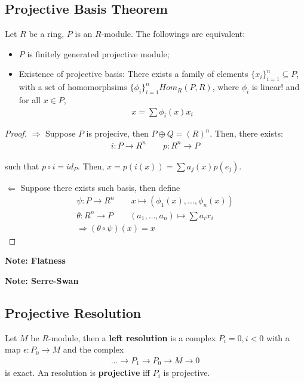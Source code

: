 \documentclass[Total.tex]{subfiles}
\begin{document}
			\subsection{Projective Basis Theorem}
				\begin{theorem}
					Let $R$ be a ring, $P$ is an $R$-module. The followings are equivalent:
					\begin{itemize}
						\item $P$ is finitely generated projective module;
						\item Existence of projective basis: There exists a family of elements $\{x_i\}_{i=1}^n\subseteq P$, with a set of homomorphsims $\{\phi_i\}_{i=1}^n Hom_R(P,R)$, where $\phi_i$ is linear! and for all $x\in P$,
						\begin{gather*}
							x=\sum \phi_i(x)x_i
						\end{gather*}
					\end{itemize}
				\end{theorem}
				\begin{proof}
					$\Rightarrow$ Suppose $P$ is projecive, then $P\oplus Q=(R)^n$. Then, there exists:
					\begin{gather*}
						i:P\rightarrow R^n\qquad p:R^n\rightarrow P
					\end{gather*}
					
					such that $p\circ i=id_P$. Then, $x=p(i(x))=\sum a_j(x)p(e_j)$.
					
					$\Leftarrow$ Suppose there exists such basis, then define
					\begin{gather*}
						\psi:P\rightarrow R^n\qquad x\mapsto (\phi_1(x),\dots,\phi_n(x))\\
						\theta:R^n\rightarrow P\qquad (a_1,\dots,a_n)\mapsto \sum a_ix_i\\
						\Rightarrow (\theta\circ \psi)(x)=x
					\end{gather*}
				\end{proof}
				
				\textbf{Note: Flatness}
				
				\textbf{Note: Serre-Swan}
			\subsection{Projective Resolution}
				\begin{Def}
					Let $M$ be $R$-module, then a \textbf{left resolution} is a complex $P_i=0,i<0$ with a map $\epsilon:P_0\rightarrow M$ and the complex
					\begin{gather*}
						\dots\rightarrow P_1\rightarrow P_0\rightarrow M\rightarrow 0
					\end{gather*}
					is exact. An resolution is \textbf{projective} iff $P_i$ is projective.
				\end{Def}
				
\end{document}
